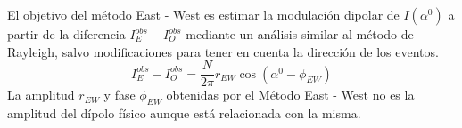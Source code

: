 





El objetivo del método  East - West es estimar la modulación dipolar de  $I(\alpha^0)$ a partir de la diferencia $I^{obs}_E -  I^{obs}_O$ mediante un análisis similar al método de  Rayleigh, salvo modificaciones para tener en cuenta la dirección de los eventos. 
\begin{equation}
    I^{obs}_E -  I^{obs}_O = \frac{N}{2\pi} r_{EW} \cos(\alpha^0 -  \phi_{EW}) \label{eq:ray_ew_like}
\end{equation}
La amplitud $r_{EW}$ y fase $\phi_{EW}$ obtenidas por el Método  East - West no es la amplitud del dípolo físico aunque está relacionada con la misma. 


